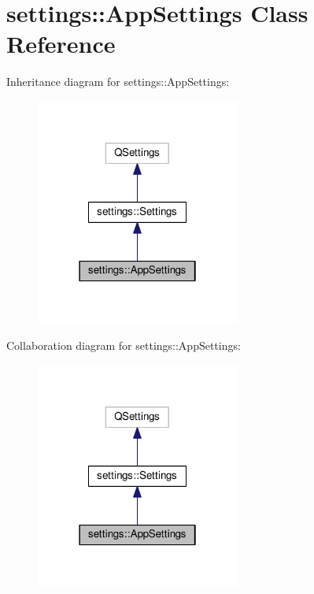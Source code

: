\hypertarget{classsettings_1_1AppSettings}{}\section{settings\+:\+:App\+Settings Class Reference}
\label{classsettings_1_1AppSettings}


Inheritance diagram for settings\+:\+:App\+Settings\+:\nopagebreak
\begin{figure}[H]
\begin{center}
\leavevmode
\includegraphics[width=190pt]{classsettings_1_1AppSettings__inherit__graph}
\end{center}
\end{figure}


Collaboration diagram for settings\+:\+:App\+Settings\+:\nopagebreak
\begin{figure}[H]
\begin{center}
\leavevmode
\includegraphics[width=190pt]{classsettings_1_1AppSettings__coll__graph}
\end{center}
\end{figure}
